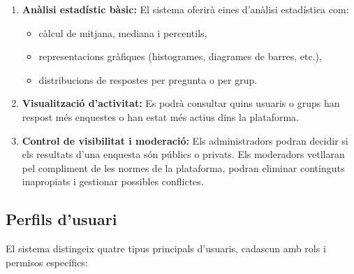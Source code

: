 \documentclass[../main.tex]{subfiles}
\begin{document}
\begin{enumerate}
    \item \textbf{Anàlisi estadístic bàsic:}  
    El sistema oferirà eines d’anàlisi estadística com:
    \begin{itemize}
        \item càlcul de mitjana, mediana i percentils,
        \item representacions gràfiques (histogrames, diagrames de barres, etc.),
        \item distribucions de respostes per pregunta o per grup.
    \end{itemize}

    \item \textbf{Visualització d’activitat:}  
    Es podrà consultar quins usuaris o grups han respost més enquestes 
    o han estat més actius dins la plataforma.

    \item \textbf{Control de visibilitat i moderació:}  
    Els administradors podran decidir si els resultats d’una enquesta són públics o privats.  
    Els moderadors vetllaran pel compliment de les normes de la plataforma, 
    podran eliminar continguts inapropiats i gestionar possibles conflictes.
\end{enumerate}


\subsection{Perfils d’usuari}

El sistema distingeix quatre tipus principals d’usuaris, cadascun amb rols i permisos específics:
\end{document}

